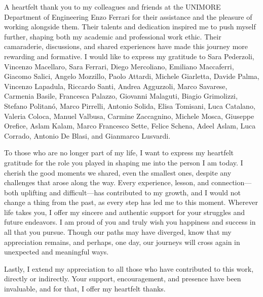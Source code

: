 A heartfelt thank you to my colleagues and friends at the UNIMORE Department of Engineering Enzo Ferrari for their assistance and the pleasure of working alongside them. Their talents and dedication inspired me to push myself further, shaping both my academic and professional work ethic. Their camaraderie, discussions, and shared experiences have made this journey more rewarding and formative. I would like to express my gratitude to Sara Pederzoli, Vincenzo Macellaro, Sara Ferrari, Diego Mercoliano, Emiliano Maccaferri, Giacomo Salici, Angelo Mozzillo, Paolo Attardi, Michele Giarletta, Davide Palma, Vincenzo Lapadula, Riccardo Santi, Andrea Agguzzoli, Marco Savarese, Carmenia Basile, Francesca Palazzo, Giovanni Malaguti, Biagio Grimolizzi, Stefano Politanó, Marco Pirrelli, Antonio Solida, Elisa Tomisani, Luca Catalano, Valeria Coloca, Manuel Valbusa, Carmine Zaccagnino, Michele Mosca, Giuseppe Orefice, Aslam Kalam, Marco Francesco Sette, Felice Schena, Adeel Aslam, Luca Corrado, Antonio De Blasi, and Gianmarco Lusvardi.

To those who are no longer part of my life, I want to express my heartfelt gratitude for the role you played in shaping me into the person I am today. I cherish the good moments we shared, even the smallest ones, despite any challenges that arose along the way. Every experience, lesson, and connection—both uplifting and difficult—has contributed to my growth, and I would not change a thing from the past, as every step has led me to this moment. Wherever life takes you, I offer my sincere and authentic support for your struggles and future endeavors. I am proud of you and truly wish you happiness and success in all that you pursue. Though our paths may have diverged, know that my appreciation remains, and perhaps, one day, our journeys will cross again in unexpected and meaningful ways.

Lastly, I extend my appreciation to all those who have contributed to this work, directly or indirectly. Your support, encouragement, and presence have been invaluable, and for that, I offer my heartfelt thanks.

